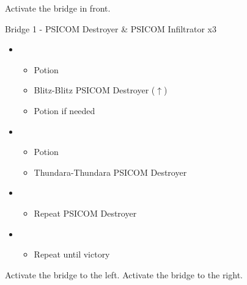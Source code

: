 Activate the bridge in front.

\begin{battle}{Bridge 1 - PSICOM Destroyer \& PSICOM Infiltrator x3}
\begin{itemize}
    \item \first
    \begin{itemize}
        \item Potion
        \item Blitz-Blitz PSICOM Destroyer ($\uparrow$)
        \item Potion if needed
    \end{itemize}
    \item \fourth
    \begin{itemize}
        \item Potion
        \item Thundara-Thundara PSICOM Destroyer
    \end{itemize}
    \item \first
    \begin{itemize}
        \item Repeat PSICOM Destroyer
    \end{itemize}
    \item \sixth
    \begin{itemize}
        \item Repeat until victory
    \end{itemize}
\end{itemize}
  
\end{battle}

Activate the bridge to the left.  Activate the bridge to the right.

